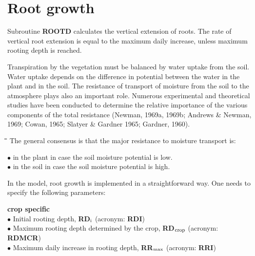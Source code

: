 \section{ Root growth  }


Subroutine {\bf ROOTD} calculates the vertical extension of roots. The rate of vertical root
extension is equal to the maximum daily increase, unless maximum rooting depth is
reached.


Transpiration by the vegetation must be balanced by water uptake from the soil. Water
uptake depends on the difference in potential between the water in the plant and in the
soil. The resistance of transport of moisture from the soil to the atmo\-sphere plays also an
important role. Numerous experimental and theoretical studies have been conducted to
determine the relative importance of the various components of the total resistance
(Newman, 1969a, 1969b; Andrews \& Newman, 1969; Cowan, 1965; Slatyer \& Gardner
1965; Gardner, 1960).\nwln
\begin{tabbing}
\hspace{1.27cm}\=\hspace{1.27cm}\=\hspace{1.27cm}\=\hspace{1.27cm}\=%
\hspace{1.27cm}\=\hspace{1.27cm}\=\hspace{1.27cm}\=\hspace{1.27cm}\=%
\hspace{1.27cm}\=\hspace{1.27cm}\=\kill
The general consensus is that the major resistance to moisture transport is:           
\end{tabbing}
$\bullet$ in the plant in case the soil moisture potential is low.\\
$\bullet$ in the soil in case the soil moisture potential is high.



In the model, root growth is implemented in a straightforward way. One needs to specify
the following parameters:

{\bf crop specific} \\
$\bullet$ Initial rooting depth, {\bf RD$_{{\rm i}}$} (acronym: {\bf RDI})\\
$\bullet$ Maximum rooting depth determined by the crop, {\bf RD$_{{\rm crop}}$} (acronym: {\bf RDMCR})\\
$\bullet$ Maximum daily increase in rooting depth, {\bf RR$_{{\rm max}}$} (acronym: {\bf RRI})

